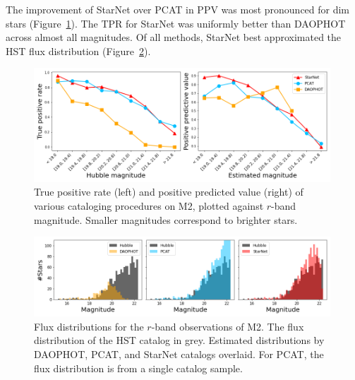 

The improvement of StarNet over PCAT in PPV was most pronounced for dim stars (Figure~\ref{fig:summary_stats}).
The TPR for StarNet was uniformly better than DAOPHOT across almost all magnitudes.
Of all methods, StarNet best approximated the HST flux distribution (Figure~\ref{fig:luminosity_fun_m2}).


\begin{figure}[tb]
    \centering
    \includegraphics[width=0.99\textwidth]{figures/m2_results/summary_statistics_m2.png}
    \vspace{-0.4cm}
    \caption{True positive rate (left) and positive predicted value (right) of various cataloging
    procedures on M2, plotted against $r$-band magnitude.
    Smaller magnitudes correspond to brighter stars.
    }
    \label{fig:summary_stats}
\end{figure}


\begin{figure}[tb]
    \centering
    \includegraphics[width=0.99\textwidth]{figures/m2_results/luminosity_fun.png}
    \vspace{-0.4cm}
    \caption{Flux distributions for the $r$-band observations of M2.
    The flux distribution of the HST catalog in grey.
    Estimated distributions by DAOPHOT, PCAT, and StarNet catalogs overlaid.
    For PCAT, the flux distribution is from a single catalog sample. }
    \label{fig:luminosity_fun_m2}
\end{figure}


